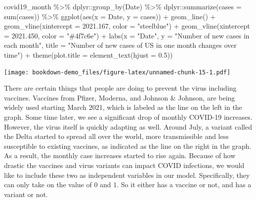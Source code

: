 \documentclass[
]{book}
\newenvironment{Shaded}{\begin{snugshade}}{\end{snugshade}}
\newcommand{\AttributeTok}[1]{\textcolor[rgb]{0.77,0.63,0.00}{#1}}
\newcommand{\FloatTok}[1]{\textcolor[rgb]{0.00,0.00,0.81}{#1}}
\newcommand{\FunctionTok}[1]{\textcolor[rgb]{0.00,0.00,0.00}{#1}}
\newcommand{\NormalTok}[1]{#1}
\newcommand{\SpecialCharTok}[1]{\textcolor[rgb]{0.00,0.00,0.00}{#1}}
\newcommand{\StringTok}[1]{\textcolor[rgb]{0.31,0.60,0.02}{#1}}
\begin{document}
\begin{Shaded}
\begin{Highlighting}[]
\NormalTok{covid19\_month }\SpecialCharTok{\%\textgreater{}\%} 
\NormalTok{  dplyr}\SpecialCharTok{::}\FunctionTok{group\_by}\NormalTok{(Date) }\SpecialCharTok{\%\textgreater{}\%}
\NormalTok{  dplyr}\SpecialCharTok{::}\FunctionTok{summarize}\NormalTok{(}\AttributeTok{cases =} \FunctionTok{sum}\NormalTok{(cases)) }\SpecialCharTok{\%\textgreater{}\%}
  \FunctionTok{ggplot}\NormalTok{(}\FunctionTok{aes}\NormalTok{(}\AttributeTok{x =}\NormalTok{ Date, }\AttributeTok{y =}\NormalTok{ cases)) }\SpecialCharTok{+}
  \FunctionTok{geom\_line}\NormalTok{() }\SpecialCharTok{+} 
  \FunctionTok{geom\_vline}\NormalTok{(}\AttributeTok{xintercept =} \FloatTok{2021.167}\NormalTok{, }\AttributeTok{color =} \StringTok{"steelblue"}\NormalTok{) }\SpecialCharTok{+}
  \FunctionTok{geom\_vline}\NormalTok{(}\AttributeTok{xintercept =} \FloatTok{2021.450}\NormalTok{, }\AttributeTok{color =} \StringTok{"\#4f7c6e"}\NormalTok{) }\SpecialCharTok{+}
  \FunctionTok{labs}\NormalTok{(}\AttributeTok{x =} \StringTok{"Date"}\NormalTok{, }\AttributeTok{y =} \StringTok{"Number of new cases in each month"}\NormalTok{, }\AttributeTok{title =} \StringTok{"Number of new cases of US in one month changes over time"}\NormalTok{) }\SpecialCharTok{+}
  \FunctionTok{theme}\NormalTok{(}\AttributeTok{plot.title =} \FunctionTok{element\_text}\NormalTok{(}\AttributeTok{hjust =} \FloatTok{0.5}\NormalTok{))}
\end{Highlighting}
\end{Shaded}

\texttt{[image: bookdown-demo\_files/figure-latex/unnamed-chunk-15-1.pdf]}

There are certain things that people are doing to prevent the virus including vaccines. Vaccines from Pfizer, Moderna, and Johnson \& Johnson, are being widely used starting March 2021, which is labeled as the line on the left in the graph. Some time later, we see a significant drop of monthly COVID-19 increases. However, the virus itself is quickly adapting as well. Around July, a variant called the Delta started to spread all over the world, more transmissible and less susceptible to existing vaccines, as indicated as the line on the right in the graph. As a result, the monthly case increases started to rise again. Because of how drastic the vaccines and virus variants can impact COVID infections, we would like to include these two as independent variables in our model. Specifically, they can only take on the value of 0 and 1. So it either has a vaccine or not, and has a variant or not.
\end{document}
